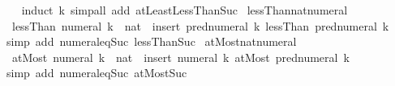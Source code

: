 \begin{isabellebody}
%
\isadelimproof
\ \ %
\endisadelimproof
%
\isatagproof
{}\isamarkupfalse%
\ {\isacharparenleft}{\kern0pt}induct\ k{\isacharparenright}{\kern0pt}\ {\isacharparenleft}{\kern0pt}simp{\isacharunderscore}{\kern0pt}all\ add{\isacharcolon}{\kern0pt}\ atLeastLessThanSuc{\isacharparenright}{\kern0pt}%
\endisatagproof
{\isafoldproof}%
%
\isadelimproof
%
\endisadelimproof
%
\isadelimdocument
%
\endisadelimdocument
%
\isatagdocument
%
\isamarkuptrue%
%
\endisatagdocument
{\isafolddocument}%
%
\isadelimdocument
%
\endisadelimdocument
{}\isamarkupfalse%
\ lessThan{\isacharunderscore}{\kern0pt}nat{\isacharunderscore}{\kern0pt}numeral{\isacharcolon}{\kern0pt}\ \ %
\isanewline
\ \ {\isachardoublequoteopen}lessThan\ {\isacharparenleft}{\kern0pt}numeral\ k\ {\isacharcolon}{\kern0pt}{\isacharcolon}{\kern0pt}\ nat{\isacharparenright}{\kern0pt}\ {\isacharequal}{\kern0pt}\ insert\ {\isacharparenleft}{\kern0pt}pred{\isacharunderscore}{\kern0pt}numeral\ k{\isacharparenright}{\kern0pt}\ {\isacharparenleft}{\kern0pt}lessThan\ {\isacharparenleft}{\kern0pt}pred{\isacharunderscore}{\kern0pt}numeral\ k{\isacharparenright}{\kern0pt}{\isacharparenright}{\kern0pt}{\isachardoublequoteclose}\isanewline
%
\isadelimproof
\ \ %
\endisadelimproof
%
\isatagproof
{}\isamarkupfalse%
\ {\isacharparenleft}{\kern0pt}simp\ add{\isacharcolon}{\kern0pt}\ numeral{\isacharunderscore}{\kern0pt}eq{\isacharunderscore}{\kern0pt}Suc\ lessThan{\isacharunderscore}{\kern0pt}Suc{\isacharparenright}{\kern0pt}%
\endisatagproof
{\isafoldproof}%
%
\isadelimproof
\isanewline
%
\endisadelimproof
\isanewline
{}\isamarkupfalse%
\ atMost{\isacharunderscore}{\kern0pt}nat{\isacharunderscore}{\kern0pt}numeral{\isacharcolon}{\kern0pt}\ \ %
\isanewline
\ \ {\isachardoublequoteopen}atMost\ {\isacharparenleft}{\kern0pt}numeral\ k\ {\isacharcolon}{\kern0pt}{\isacharcolon}{\kern0pt}\ nat{\isacharparenright}{\kern0pt}\ {\isacharequal}{\kern0pt}\ insert\ {\isacharparenleft}{\kern0pt}numeral\ k{\isacharparenright}{\kern0pt}\ {\isacharparenleft}{\kern0pt}atMost\ {\isacharparenleft}{\kern0pt}pred{\isacharunderscore}{\kern0pt}numeral\ k{\isacharparenright}{\kern0pt}{\isacharparenright}{\kern0pt}{\isachardoublequoteclose}\isanewline
%
\isadelimproof
\ \ %
\endisadelimproof
%
\isatagproof
{}\isamarkupfalse%
\ {\isacharparenleft}{\kern0pt}simp\ add{\isacharcolon}{\kern0pt}\ numeral{\isacharunderscore}{\kern0pt}eq{\isacharunderscore}{\kern0pt}Suc\ atMost{\isacharunderscore}{\kern0pt}Suc{\isacharparenright}{\kern0pt}%

\end{isabellebody}
